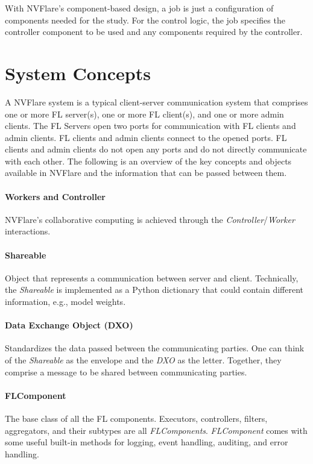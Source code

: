 \documentclass[11pt]{article}
\begin{document}
%
With NVFlare's component-based design, a job is just a configuration of components needed for the study. For the control logic, the job specifies the controller component to be used and any components required by the controller.
%
\section{System Concepts}
%
A NVFlare system is a typical client-server communication system that comprises one or more FL server(s), one or more FL client(s), and one or more admin clients. The FL Servers open two ports for communication with FL clients and admin clients. FL clients and admin clients connect to the opened ports. FL clients and admin clients do not open any ports and do not directly communicate with each other.
%
The following is an overview of the key concepts and objects available in NVFlare and the information that can be passed between them.

\paragraph{Workers and Controller} NVFlare’s collaborative computing is achieved through the \textit{Controller}/\textit{Worker} interactions.

\paragraph{Shareable} Object that represents a communication between server and client. Technically, the \textit{Shareable} is implemented as a Python dictionary that could contain different information, e.g., model weights.

\paragraph{Data Exchange Object (DXO)} Standardizes the data passed between the communicating parties. One can think of the \textit{Shareable} as the envelope and the \textit{DXO} as the letter. Together, they comprise a message to be shared between communicating parties.

\paragraph{FLComponent} The base class of all the FL components. Executors, controllers, filters, aggregators, and their subtypes are all \textit{FLComponents}.
\textit{FLComponent} comes with some useful built-in methods for logging, event handling, auditing, and error handling.
\end{document}

